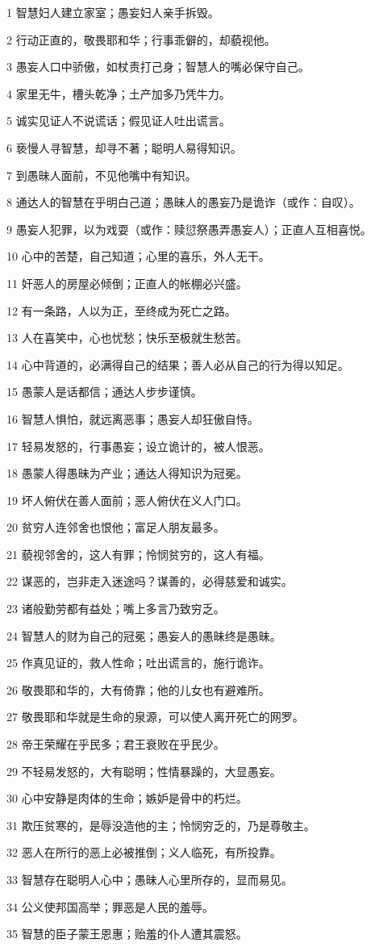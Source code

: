 \par 1 智慧妇人建立家室；愚妄妇人亲手拆毁。
\par 2 行动正直的，敬畏耶和华；行事乖僻的，却藐视他。
\par 3 愚妄人口中骄傲，如杖责打己身；智慧人的嘴必保守自己。
\par 4 家里无牛，槽头乾净；土产加多乃凭牛力。
\par 5 诚实见证人不说谎话；假见证人吐出谎言。
\par 6 亵慢人寻智慧，却寻不著；聪明人易得知识。
\par 7 到愚昧人面前，不见他嘴中有知识。
\par 8 通达人的智慧在乎明白己道；愚昧人的愚妄乃是诡诈（或作：自叹）。
\par 9 愚妄人犯罪，以为戏耍（或作：赎愆祭愚弄愚妄人）；正直人互相喜悦。
\par 10 心中的苦楚，自己知道；心里的喜乐，外人无干。
\par 11 奸恶人的房屋必倾倒；正直人的帐棚必兴盛。
\par 12 有一条路，人以为正，至终成为死亡之路。
\par 13 人在喜笑中，心也忧愁；快乐至极就生愁苦。
\par 14 心中背道的，必满得自己的结果；善人必从自己的行为得以知足。
\par 15 愚蒙人是话都信；通达人步步谨慎。
\par 16 智慧人惧怕，就远离恶事；愚妄人却狂傲自恃。
\par 17 轻易发怒的，行事愚妄；设立诡计的，被人恨恶。
\par 18 愚蒙人得愚昧为产业；通达人得知识为冠冕。
\par 19 坏人俯伏在善人面前；恶人俯伏在义人门口。
\par 20 贫穷人连邻舍也恨他；富足人朋友最多。
\par 21 藐视邻舍的，这人有罪；怜悯贫穷的，这人有福。
\par 22 谋恶的，岂非走入迷途吗？谋善的，必得慈爱和诚实。
\par 23 诸般勤劳都有益处；嘴上多言乃致穷乏。
\par 24 智慧人的财为自己的冠冕；愚妄人的愚昧终是愚昧。
\par 25 作真见证的，救人性命；吐出谎言的，施行诡诈。
\par 26 敬畏耶和华的，大有倚靠；他的儿女也有避难所。
\par 27 敬畏耶和华就是生命的泉源，可以使人离开死亡的网罗。
\par 28 帝王荣耀在乎民多；君王衰败在乎民少。
\par 29 不轻易发怒的，大有聪明；性情暴躁的，大显愚妄。
\par 30 心中安静是肉体的生命；嫉妒是骨中的朽烂。
\par 31 欺压贫寒的，是辱没造他的主；怜悯穷乏的，乃是尊敬主。
\par 32 恶人在所行的恶上必被推倒；义人临死，有所投靠。
\par 33 智慧存在聪明人心中；愚昧人心里所存的，显而易见。
\par 34 公义使邦国高举；罪恶是人民的羞辱。
\par 35 智慧的臣子蒙王恩惠；贻羞的仆人遭其震怒。

